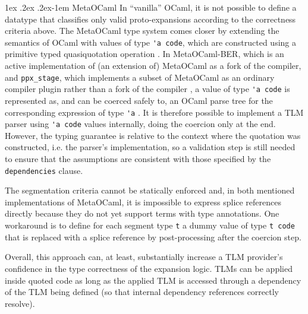 \documentclass[acmsmall,screen]{acmart}
\makeatletter
\renewcommand{\subsubsection}{%
  \@startsection{subsubsection}{3}%
  {\z@}{1ex \@plus .2ex \@minus .2ex}{-1em}%
  {\sffamily\normalsize\itshape\maybe@addperiod}%
}
\newcommand{\maybe@addperiod}[1]{%
  #1\@addpunct{.}%
}
\newcommand{\li}[1]{\lstinline[basicstyle=\ttfamily\fontsize{9pt}{1em}\selectfont]{#1}}
\makeatother
\begin{document}
\subsubsection{MetaOCaml}\label{sec:metaocaml} In ``vanilla'' OCaml, it is not possible to define a datatype that classifies only valid proto-expansions according to the correctness criteria above. The MetaOCaml type system comes closer by extending the semantics of OCaml with values of type \li{'a code}, which are constructed using a primitive typed quasiquotation operation \cite{DBLP:conf/flops/Kiselyov14,taha2004gentle}. In MetaOCaml-BER, which is an active implementation of (an extension of) MetaOCaml as a fork of the compiler, and \li{ppx_stage}, which implements a subset of MetaOCaml as an ordinary compiler plugin rather than a fork of the compiler \cite{ppxstage}, a value of type \li{'a code} is represented as, and can be coerced safely to, an OCaml parse tree for the corresponding expression of type \li{'a} \cite{DBLP:conf/flops/Kiselyov14}. It is therefore possible to implement a TLM parser using \li{'a code} values internally, doing the coercion only at the end. However, the typing guarantee is relative to the context where the quotation was constructed, i.e. the parser's implementation, so a validation step is still needed to ensure that the assumptions are consistent with those specified by the \li{dependencies} clause. 

The segmentation criteria cannot be statically enforced and, in both mentioned implementations of MetaOCaml, it is impossible to express splice references directly because they do not yet support terms with type annotations. One workaround is to define for each  segment type \li{t} a dummy value of type \li{t code} that is replaced with a splice reference by post-processing after the coercion step. 

Overall, this approach can, at least, substantially increase a TLM provider's confidence in the type correctness of the expansion logic. 
TLMs can be applied inside quoted code as long as the applied TLM is accessed through a dependency of the TLM being defined (so that internal dependency references correctly resolve). %
\end{document}
